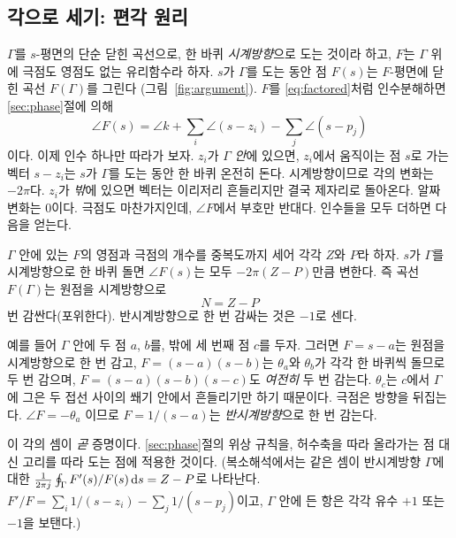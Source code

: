 \documentclass[11pt]{article}
\begin{document}
\subsection{각으로 세기: 편각 원리}\label{sec:argument}
$\Gamma$를 $s$-평면의 단순 닫힌 곡선으로, 한 바퀴 \emph{시계방향}으로 도는
것이라 하고, $F$는 $\Gamma$ 위에 극점도 영점도 없는 유리함수라 하자. $s$가
$\Gamma$를 도는 동안 점 $F(s)$는 $F$-평면에 닫힌 곡선 $F(\Gamma)$를 그린다
(그림~\ref{fig:argument}). $F$를 \eqref{eq:factored}처럼 인수분해하면
\ref{sec:phase}절에 의해
\[
   \angle F(s) = \angle k + \sum_i \angle(s-z_i) - \sum_j \angle(s-p_j)
\]
이다. 이제 인수 하나만 따라가 보자. $z_i$가 $\Gamma$ \emph{안}에 있으면, $z_i$에서
움직이는 점 $s$로 가는 벡터 $s-z_i$는 $s$가 $\Gamma$를 도는 동안 한 바퀴 온전히
돈다. 시계방향이므로 각의 변화는 $-2\pi$다. $z_i$가 \emph{밖}에 있으면 벡터는
이리저리 흔들리지만 결국 제자리로 돌아온다. 알짜 변화는 $0$이다. 극점도 마찬가지인데,
$\angle F$에서 부호만 반대다. 인수들을 모두 더하면 다음을 얻는다.

\begin{theorem}[편각 원리]\label{thm:argument}
$\Gamma$ 안에 있는 $F$의 영점과 극점의 개수를 중복도까지 세어 각각 $Z$와 $P$라
하자. $s$가 $\Gamma$를 시계방향으로 한 바퀴 돌면 $\angle F(s)$는 모두
$-2\pi(Z-P)$만큼 변한다. 즉 곡선 $F(\Gamma)$는 원점을 시계방향으로
\[
   N = Z - P
\]
번 감싼다(포위한다). 반시계방향으로 한 번 감싸는 것은 $-1$로 센다.
\end{theorem}

예를 들어 $\Gamma$ 안에 두 점 $a$, $b$를, 밖에 세 번째 점 $c$를 두자. 그러면
$F=s-a$는 원점을 시계방향으로 한 번 감고, $F=(s-a)(s-b)$는 $\theta_a$와
$\theta_b$가 각각 한 바퀴씩 돌므로 두 번 감으며, $F=(s-a)(s-b)(s-c)$도
\emph{여전히} 두 번 감는다. $\theta_c$는 $c$에서 $\Gamma$에 그은 두 접선 사이의
쐐기 안에서 흔들리기만 하기 때문이다. 극점은 방향을 뒤집는다. $\angle F=-\theta_a$
이므로 $F=1/(s-a)$는 \emph{반시계방향}으로 한 번 감는다.

이 각의 셈이 \emph{곧} 증명이다. \ref{sec:phase}절의 위상 규칙을, 허수축을 따라
올라가는 점 대신 고리를 따라 도는 점에 적용한 것이다. (복소해석에서는 같은 셈이
반시계방향 $\Gamma$에 대한
$\frac{1}{2\pi j}\oint_\Gamma F'(s)/F(s)\,\mathrm{d} s = Z-P$로 나타난다.
$F'/F=\sum_i 1/(s-z_i)-\sum_j 1/(s-p_j)$이고, $\Gamma$ 안에 든 항은 각각 유수
$+1$ 또는 $-1$을 보탠다.)
\end{document}

